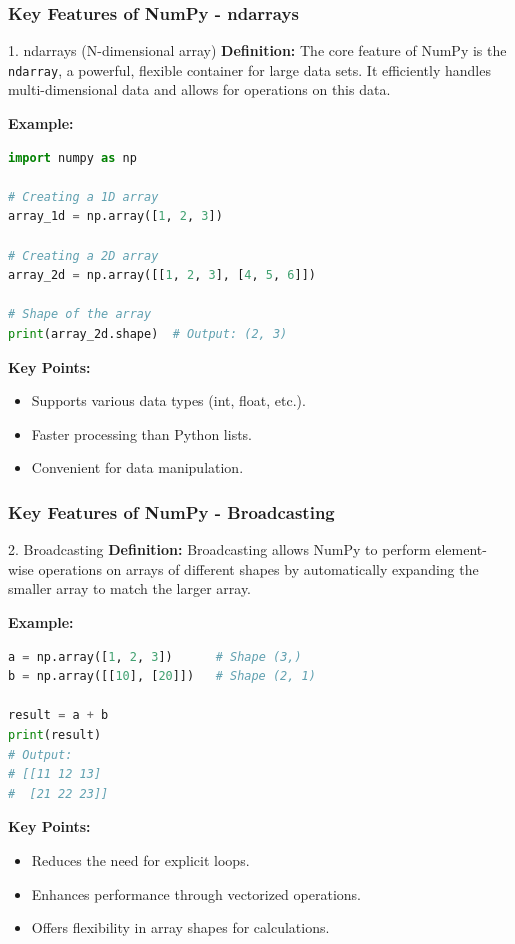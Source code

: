\documentclass{beamer}
\begin{document}
\begin{frame}[fragile]
    \frametitle{Key Features of NumPy - ndarrays}
    \begin{block}{1. ndarrays (N-dimensional array)}
        \textbf{Definition:} The core feature of NumPy is the \texttt{ndarray}, a powerful, flexible container for large data sets. It efficiently handles multi-dimensional data and allows for operations on this data.

        \textbf{Example:}
        \begin{lstlisting}[language=Python]
import numpy as np

# Creating a 1D array
array_1d = np.array([1, 2, 3])

# Creating a 2D array
array_2d = np.array([[1, 2, 3], [4, 5, 6]])

# Shape of the array
print(array_2d.shape)  # Output: (2, 3)
        \end{lstlisting}

        \textbf{Key Points:}
        \begin{itemize}
            \item Supports various data types (int, float, etc.).
            \item Faster processing than Python lists.
            \item Convenient for data manipulation.
        \end{itemize}
    \end{block}
\end{frame}

\begin{frame}[fragile]
    \frametitle{Key Features of NumPy - Broadcasting}
    \begin{block}{2. Broadcasting}
        \textbf{Definition:} Broadcasting allows NumPy to perform element-wise operations on arrays of different shapes by automatically expanding the smaller array to match the larger array.

        \textbf{Example:}
        \begin{lstlisting}[language=Python]
a = np.array([1, 2, 3])      # Shape (3,)
b = np.array([[10], [20]])   # Shape (2, 1)

result = a + b
print(result)
# Output:
# [[11 12 13]
#  [21 22 23]]
        \end{lstlisting}

        \textbf{Key Points:}
        \begin{itemize}
            \item Reduces the need for explicit loops.
            \item Enhances performance through vectorized operations.
            \item Offers flexibility in array shapes for calculations.
        \end{itemize}
    \end{block}
\end{frame}
\end{document}
